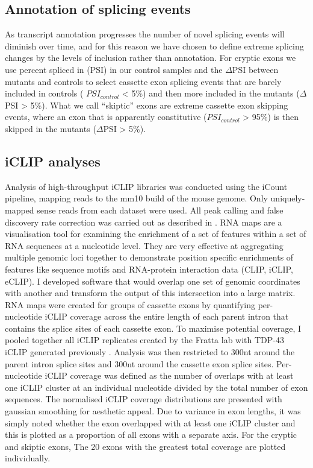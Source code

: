 \subsection{Annotation of splicing events}
As transcript annotation progresses the number of novel splicing events will diminish over time, and for this reason we have chosen to define extreme splicing changes by the levels of inclusion rather than annotation. For cryptic exons we use percent spliced  in  (PSI)  in  our  control  samples  and  the   $\Delta$PSI  between  mutants  and  controls  to  select cassette exon splicing events that are barely included in controls ( $PSI_{control}$ < 5\%) and then more included in the mutants ($\Delta$PSI > 5\%). What we call ``skiptic'' exons are extreme cassette exon skipping events, where an exon that is apparently constitutive ($PSI_{control}$ > 95\%) is then skipped in the mutants ($\Delta$PSI > 5\%).

\subsection{iCLIP analyses}
Analysis  of  high-throughput  iCLIP  libraries  was  conducted  using  the  iCount  pipeline,  mapping  reads  to  the mm10 build of the mouse genome.
Only  uniquely-mapped  sense  reads  from each dataset were used. All peak calling and false discovery rate correction was carried out as described in \citep{Huppertz2014-ip,Konig2010}. 
RNA maps are a visualisation tool for examining the enrichment of a set of features within a set of RNA sequences at a nucleotide level. They are very effective at aggregating multiple genomic loci together to demonstrate position specific enrichments of features like sequence motifs and RNA-protein interaction data (CLIP, iCLIP, eCLIP). 
I developed software  that would overlap one set of genomic coordinates with another and transform the output of this intersection into a large matrix.  RNA maps were created  for groups of cassette exons by quantifying per-nucleotide iCLIP coverage across the entire length of each parent intron that contains the splice sites of each cassette exon. To maximise  potential  coverage,  I pooled together all  iCLIP  replicates created  by the Fratta lab with  TDP-43  iCLIP generated previously \citep{Rogelj2012}. Analysis was  then  restricted  to 300nt around  the parent intron splice sites and 300nt around the cassette exon splice sites. Per-nucleotide iCLIP coverage was defined as the number of overlaps with at least one iCLIP cluster at an individual nucleotide divided by the total number of exon sequences. The normalised iCLIP coverage distributions are presented with gaussian smoothing for aesthetic appeal. Due to variance in exon lengths, it was simply noted whether the exon overlapped with at least one iCLIP cluster and this is plotted as a proportion of all exons with a separate axis. For the cryptic and skiptic exons, The 20 exons with the greatest total coverage are plotted individually. 

